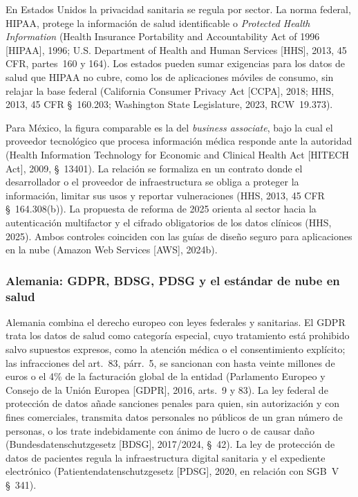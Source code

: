 \documentclass[12pt, a4paper]{article}
\begin{document}
En Estados Unidos la privacidad sanitaria se regula por sector. La
norma federal, HIPAA, protege la información de salud identificable o
\textit{Protected Health Information} (Health Insurance Portability
and Accountability Act of 1996 [HIPAA], 1996; U.S. Department of
Health and Human Services [HHS], 2013, 45 CFR, partes~160 y 164). Los
estados pueden sumar exigencias para los datos de salud que HIPAA no
cubre, como los de aplicaciones móviles de consumo, sin relajar la
base federal (California Consumer Privacy Act [CCPA], 2018;
HHS, 2013, 45 CFR \S~160.203; Washington State Legislature, 2023,
RCW~19.373).
 
Para México, la figura comparable es la del \textit{business
associate}, bajo la cual el proveedor tecnológico que procesa
información médica responde ante la autoridad (Health Information
Technology for Economic and Clinical Health Act [HITECH Act], 2009,
\S~13401). La relación se formaliza en un contrato donde el
desarrollador o el proveedor de infraestructura se obliga a proteger
la información, limitar sus usos y reportar vulneraciones (HHS, 2013,
45 CFR \S~164.308(b)). La propuesta de reforma de 2025 orienta al
sector hacia la autenticación multifactor y el cifrado obligatorios
de los datos clínicos (HHS, 2025). Ambos controles coinciden con las
guías de diseño seguro para aplicaciones en la nube (Amazon Web
Services [AWS], 2024b).

\subsubsection{Alemania: GDPR, BDSG, PDSG y el estándar de nube en salud}

Alemania combina el derecho europeo con leyes federales y sanitarias.
El GDPR trata los datos de salud como categoría especial, cuyo
tratamiento está prohibido salvo supuestos expresos, como la atención
médica o el consentimiento explícito; las infracciones del art.~83, párr.~5, se
sancionan con hasta veinte millones de euros o el 4\% de la
facturación global de la entidad (Parlamento Europeo y Consejo de la
Unión Europea [GDPR], 2016, arts.~9 y 83). La ley federal de
protección de datos añade sanciones penales para quien, sin autorización y con fines comerciales, transmita datos personales no públicos de un gran número de personas, o los trate indebidamente con ánimo de lucro o de causar daño (Bundesdatenschutzgesetz [BDSG], 2017/2024, \S~42). La ley de protección de datos de pacientes
regula la infraestructura digital sanitaria y el expediente
electrónico (Patientendatenschutzgesetz [PDSG], 2020, en relación con
SGB~V \S~341).
 
\end{document}
